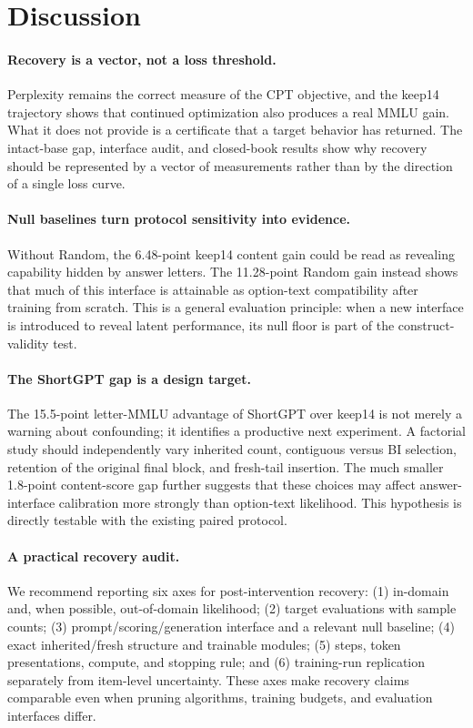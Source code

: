 \section{Discussion}
\label{sec:discussion}

\paragraph{Recovery is a vector, not a loss threshold.}
Perplexity remains the correct measure of the CPT objective, and the keep14
trajectory shows that continued optimization also produces a real MMLU gain.
What it does not provide is a certificate that a target behavior has returned.
The intact-base gap, interface audit, and closed-book results show why recovery
should be represented by a vector of measurements rather than by the direction
of a single loss curve.

\paragraph{Null baselines turn protocol sensitivity into evidence.}
Without Random, the 6.48-point keep14 content gain could be read as revealing
capability hidden by answer letters. The 11.28-point Random gain instead shows
that much of this interface is attainable as option-text compatibility after
training from scratch. This is a general evaluation principle: when a new
interface is introduced to reveal latent performance, its null floor is part
of the construct-validity test.

\paragraph{The ShortGPT gap is a design target.}
The 15.5-point letter-MMLU advantage of ShortGPT over keep14 is not merely a
warning about confounding; it identifies a productive next experiment. A
factorial study should independently vary inherited count, contiguous versus
BI selection, retention of the original final block, and fresh-tail insertion.
The much smaller 1.8-point content-score gap further suggests that these choices
may affect answer-interface calibration more strongly than option-text
likelihood. This hypothesis is directly testable with the existing paired
protocol.

\paragraph{A practical recovery audit.}
We recommend reporting six axes for post-intervention recovery:
(1) in-domain and, when possible, out-of-domain likelihood;
(2) target evaluations with sample counts;
(3) prompt/scoring/generation interface and a relevant null baseline;
(4) exact inherited/fresh structure and trainable modules;
(5) steps, token presentations, compute, and stopping rule; and
(6) training-run replication separately from item-level uncertainty.
These axes make recovery claims comparable even when pruning algorithms,
training budgets, and evaluation interfaces differ.
